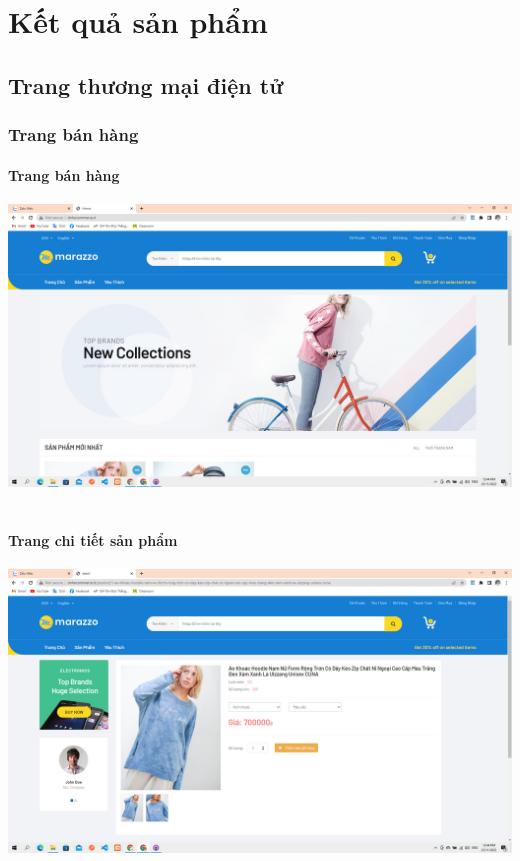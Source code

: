 \documentclass[12pt,a4paper,2sides]{report}
\begin{document}
\chapter{Kết quả sản phẩm}
\section{Trang thương mại điện tử}
\subsection{Trang bán hàng}
\subsubsection{Trang bán hàng}
    \includegraphics[width=1\linewidth]{lib/results/trangchu.jpg}\\\vspace*{1cm} 
    \hspace{5cm}{Hình 37. Trang chủ}\\
\subsubsection{Trang chi tiết sản phẩm}
    \includegraphics[width=1\linewidth]{lib/results/trangchitietsp.jpg}\\\vspace*{1cm}
    \hspace{5cm}{Hình 38. Trang chi tiết sản phẩm}\\
\end{document}
